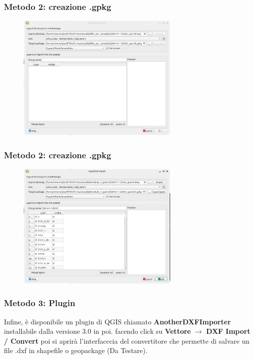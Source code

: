 \documentclass{beamer}
\begin{document}
{\begin{frame}
  \frametitle{Metodo 2: creazione .gpkg}

    \begin{figure}[h]
        \centering
        \includegraphics[width=0.7\textwidth]{pics/geopackage.png} 
    \end{figure}
    

\end{frame}

\begin{frame}
  \frametitle{Metodo 2: creazione .gpkg}

    \begin{figure}[h]
        \centering
        \includegraphics[width=0.7\textwidth]{pics/geopackage2.png} 
    \end{figure}
    

\end{frame} 


\begin{frame}
  \frametitle{Metodo 3: Plugin}
   Infine, è disponibile un plugin di QGIS chiamato \textbf{AnotherDXFImporter} installabile dalla versione 3.0 in poi.
   facendo click su \textbf{Vettore} $\rightarrow$ \textbf{DXF Import / Convert} poi si aprirà l'interfacccia del convertitore che permette di salvare un file .dxf in shapefile o geopackage (Da Testare).
		    

\end{frame}}
\end{document}
